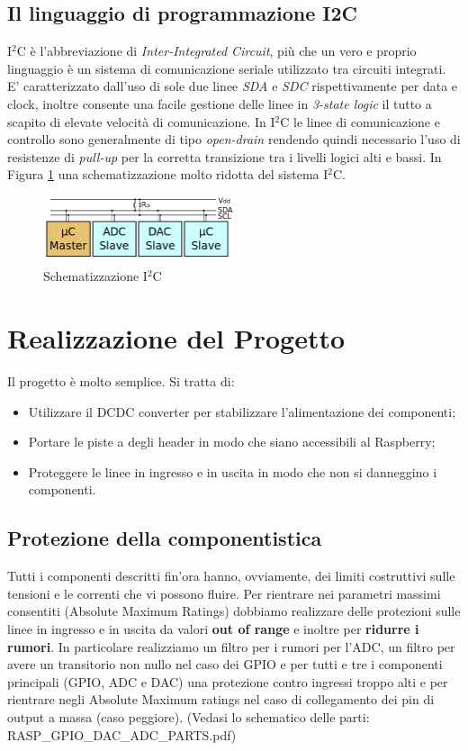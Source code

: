 \documentclass[10pt]{article}
\begin{document}
	\subsection{Il linguaggio di programmazione I2C}\label{sec:i2c}
		I\(^2\)C è l'abbreviazione di \emph{Inter-Integrated Circuit}, più che un vero e proprio linguaggio è un sistema di comunicazione seriale utilizzato tra circuiti integrati. E' caratterizzato dall'uso di sole due linee \emph{SDA} e \emph{SDC} rispettivamente per data e clock, inoltre consente una facile gestione delle linee in \emph{3-state logic} il tutto a scapito di elevate velocità di comunicazione.
		In I\(^2\)C le linee di comunicazione e controllo sono generalmente di tipo \emph{open-drain} rendendo quindi necessario l'uso di resistenze di \emph{pull-up} per la corretta transizione tra i livelli logici alti e bassi.
		In Figura \ref{fig:i2c} una schematizzazione molto ridotta del sistema I\(^2\)C.
		\begin{figure}[h]
		\centering
		\includegraphics[width=0.5\textwidth]{src/i2c}
		\caption{Schematizzazione I\(^2\)C}\label{fig:i2c}
		\end{figure}


\section{Realizzazione del Progetto}
		Il progetto è molto semplice. Si tratta di:
		\begin{itemize}
		        \item Utilizzare il DCDC converter per stabilizzare l'alimentazione dei componenti;
		        \item Portare le piste a degli header in modo che siano accessibili al Raspberry;
		        \item Proteggere le linee in ingresso e in uscita in modo che non si danneggino i componenti.
		\end{itemize}

	\subsection{Protezione della componentistica}
		Tutti i componenti descritti fin'ora hanno, ovviamente, dei limiti costruttivi sulle tensioni e le correnti che vi possono fluire. Per rientrare nei parametri massimi consentiti (Absolute Maximum Ratings) dobbiamo realizzare delle protezioni sulle linee in ingresso e in uscita da valori \textbf{out of range} e inoltre per \textbf{ridurre i rumori}.
		In particolare realizziamo un filtro per i rumori per l'ADC, un filtro per avere un transitorio non nullo nel caso dei GPIO e per tutti e tre i componenti principali (GPIO, ADC e DAC) una protezione contro ingressi troppo alti e per rientrare negli Absolute Maximum ratings nel caso di collegamento dei pin di output a massa (caso peggiore).
		(Vedasi lo schematico delle parti: RASP\_GPIO\_DAC\_ADC\_PARTS.pdf)
		
\end{document}
